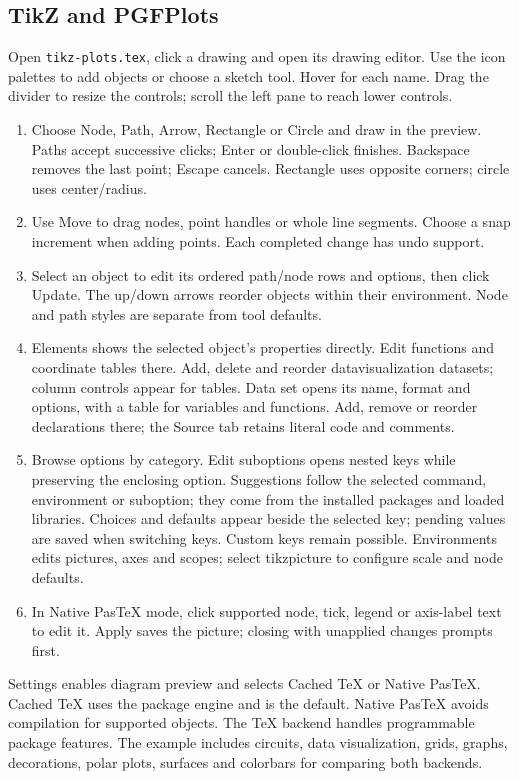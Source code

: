 \documentclass[11pt]{article}
\begin{document}
\subsection{TikZ and PGFPlots}
Open \texttt{tikz-plots.tex}, click a drawing and open its drawing editor.
Use the icon palettes to add objects or choose a sketch tool. Hover for each name.
Drag the divider to resize the controls; scroll the left pane to reach lower controls.
\begin{enumerate}
\item Choose Node, Path, Arrow, Rectangle or Circle and draw in the preview.
Paths accept successive clicks; Enter or double-click finishes. Backspace removes
the last point; Escape cancels. Rectangle uses opposite corners; circle uses center/radius.
\item Use Move to drag nodes, point handles or whole line segments. Choose a snap
increment when adding points. Each completed change has undo support.
\item Select an object to edit its ordered path/node rows and options, then click
Update. The up/down arrows reorder objects within their environment.
Node and path styles are separate from tool defaults.
\item Elements shows the selected object's properties directly. Edit functions and
coordinate tables there. Add, delete and reorder
datavisualization datasets; column controls appear for tables. Data set opens its name,
format and options, with a table for variables and functions. Add, remove or
reorder declarations there; the Source tab retains literal code and comments.
\item Browse options by category. Edit suboptions opens nested keys while preserving
the enclosing option. Suggestions follow the selected command, environment or suboption;
they come from the installed packages and loaded libraries. Choices and defaults appear
beside the selected key; pending values are saved when switching keys. Custom keys remain possible.
Environments edits pictures, axes and scopes;
select tikzpicture to configure scale and node defaults.
\item In Native PasTeX mode, click supported node, tick, legend or axis-label text
to edit it. Apply saves the picture; closing with unapplied changes prompts first.
\end{enumerate}
Settings enables diagram preview and selects Cached TeX or Native PasTeX. Cached
TeX uses the package engine and is the default. Native PasTeX avoids compilation
for supported objects. The \TeX{} backend handles programmable package features.
The example includes circuits, data visualization, grids, graphs, decorations,
polar plots, surfaces and colorbars for comparing both backends.
\end{document}
